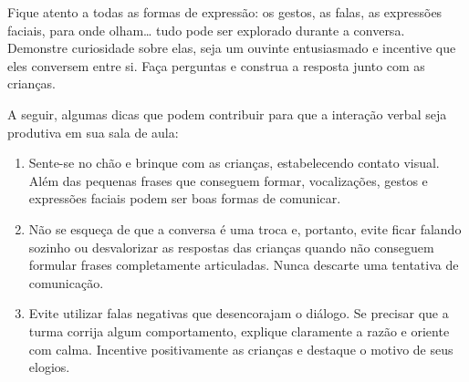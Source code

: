 \documentclass[11pt]{extarticle}
\begin{document}
Fique atento a todas as formas de expressão: os gestos, as falas, as 
expressões faciais, para onde olham\ldots{} tudo pode ser explorado durante a conversa. 
Demonstre curiosidade sobre elas, seja um ouvinte entusiasmado e incentive que eles 
conversem entre si. Faça perguntas e construa a resposta junto com as crianças. 

A seguir, algumas dicas que podem contribuir para que a interação verbal 
seja produtiva em sua sala de aula: 

\begin{enumerate}
\item Sente-se no chão e brinque com as crianças, estabelecendo 
contato visual. Além das pequenas frases que conseguem formar, vocalizações, 
gestos e expressões faciais podem ser boas formas de comunicar.

\item Não se esqueça de que a conversa é uma troca e, portanto, 
evite ficar falando sozinho ou desvalorizar as respostas das 
crianças quando não conseguem formular frases completamente articuladas. 
Nunca descarte uma tentativa de comunicação. 

\item Evite utilizar falas negativas que desencorajam o diálogo. 
Se precisar que a turma 
corrija algum comportamento, explique claramente a razão e 
oriente com calma. Incentive positivamente as crianças e 
destaque o motivo de seus elogios. 



\end{enumerate}
\end{document}
